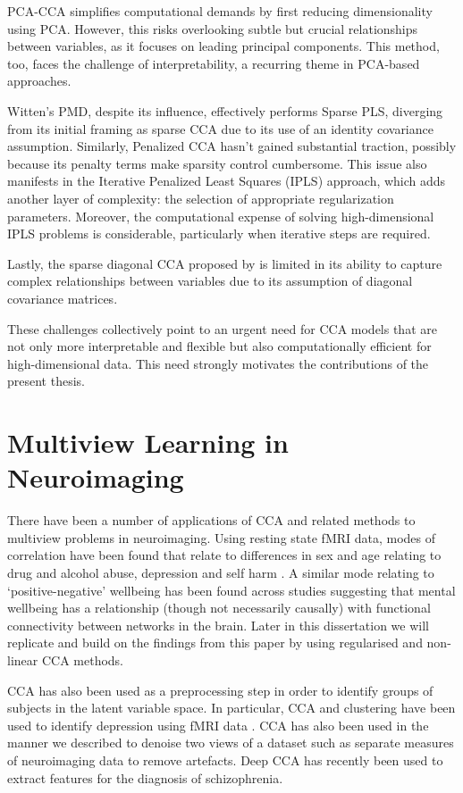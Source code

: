 PCA-CCA simplifies computational demands by first reducing dimensionality using PCA. However, this risks overlooking subtle but crucial relationships between variables, as it focuses on leading principal components.
This method, too, faces the challenge of interpretability, a recurring theme in PCA-based approaches.

Witten's PMD, despite its influence, effectively performs Sparse PLS, diverging from its initial framing as sparse CCA due to its use of an identity covariance assumption.
Similarly, Penalized CCA \cite{parkhomenko2009sparse} hasn't gained substantial traction, possibly because its penalty terms make sparsity control cumbersome.
This issue also manifests in the Iterative Penalized Least Squares (IPLS) approach, which adds another layer of complexity: the selection of appropriate regularization parameters.
Moreover, the computational expense of solving high-dimensional IPLS problems is considerable, particularly when iterative steps are required.

Lastly, the sparse diagonal CCA proposed by \cite{asteris2016simple} is limited in its ability to capture complex relationships between variables due to its assumption of diagonal covariance matrices.

These challenges collectively point to an urgent need for CCA models that are not only more interpretable and flexible but also computationally efficient for high-dimensional data.
This need strongly motivates the contributions of the present thesis.


\section{Multiview Learning in Neuroimaging}

There have been a number of applications of CCA and related methods to multiview problems in neuroimaging.
Using resting state fMRI data, modes of correlation have been found that relate to differences in sex and age relating to drug and alcohol abuse, depression and self harm \cite{mihalik2019brain}.
A similar mode relating to `positive-negative' wellbeing has been found across studies \cite{smith2015positive}suggesting that mental wellbeing has a relationship (though not necessarily causally) with functional connectivity between networks in the brain.
Later in this dissertation we will replicate and build on the findings from this paper by using regularised and non-linear CCA methods.

CCA has also been used as a preprocessing step in order to identify groups of subjects in the latent variable space.
In particular, CCA and clustering have been used to identify depression using fMRI data\cite{dinga2019evaluating} \cite{drysdale2017resting}.
CCA has also been used in the manner we described to denoise two views of a dataset such as separate measures of neuroimaging data \cite{zhuang2020technical} to remove artefacts.
Deep CCA has recently been used to extract features for the diagnosis of schizophrenia\cite{qi2016deep}.


